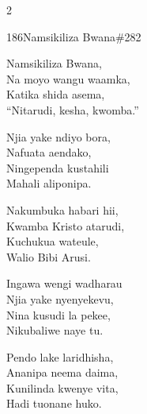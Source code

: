 \documentclass{article}
\begin{document}
\begin{multicols}{2}
\begin{hymn}{186}{Namsikiliza Bwana}{\#282}
\begin{stanza}
Namsikiliza Bwana,\\
Na moyo wangu waamka,\\
Katika shida asema,\\
``Nitarudi, kesha, kwomba.''
\end{stanza}
\begin{chorus}
Njia yake ndiyo bora,\\
Nafuata aendako,\\
Ningependa kustahili\\
Mahali aliponipa.
\end{chorus}
\begin{stanza}
Nakumbuka habari hii,\\
Kwamba Kristo atarudi,\\
Kuchukua wateule,\\
Walio Bibi Arusi.
\end{stanza}
\begin{stanza}
Ingawa wengi wadharau\\
Njia yake nyenyekevu,\\
Nina kusudi la pekee,\\
Nikubaliwe naye tu.
\end{stanza}
\begin{stanza}
Pendo lake laridhisha,\\
Ananipa neema daima,\\
Kunilinda kwenye vita,\\
Hadi tuonane huko.
\end{stanza}
\end{hymn}


\end{multicols}
\end{document}

